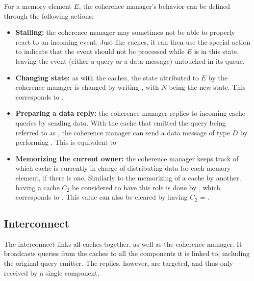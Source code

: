 For a memory element $E$, the coherence manager's behavior can be defined
through the following actions:
\begin{itemize}
\item \textbf{Stalling:}
   the coherence manager may sometimes not be able to properly react to an
   incoming event. Just like caches, it can then use the special \stallact{}
   action to indicate that the event should not be processed while $E$ is in
   this state, leaving the event (either a query or a data message) untouched
   in its queue.

\item \textbf{Changing state:}
   as with the caches, the state attributed to $E$ by the coherence manager
   is changed by writing , with $N$ being the new state.
   This corresponds to .

\item \textbf{Preparing a data reply:}
   the coherence manager replies to incoming cache queries by sending data.
   With the cache that emitted the query being referred to as \sendertarget{},
   the coherence manager can send a data message of type $D$ by performing
   . This is equivalent to

\item \textbf{Memorizing the current owner:}
   the coherence manager keeps track of which cache is currently in charge of
   distributing data for each memory element, if there is one. Similarly to the
   memorizing of a cache by another, having a cache $C_2$ be considered to have
   this role is done by \storeowneract{}, which corresponds to
   . This value can also be
   cleared by having $C_2$ = \nocache{}.
\end{itemize}

\subsection{Interconnect}
The interconnect links all caches together, as well as the coherence manager.
It broadcasts queries from the caches to all the components it is linked to,
including the original query emitter. The replies, however, are targeted, and
thus only received by a single component.

